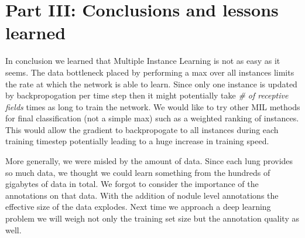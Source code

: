 \documentclass[twocolumn,10pt]{article}
\begin{document}
\section{Part III: Conclusions and lessons learned}

In conclusion we learned that Multiple Instance Learning is not as easy as it seems. The data bottleneck placed by performing a max over all instances limits the rate at which the network is able to learn. Since only one instance is updated by backpropogation per time step then it might potentially take \textit{\# of receptive fields} times as long to train the network. We would like to try other MIL methods for final classification (not a simple max) such as a weighted ranking of instances. This would allow the gradient to backpropogate to all instances during each training timestep potentially leading to a huge increase in training speed.

More generally, we were misled by the amount of data. Since each lung provides so much data, we thought we could learn something from the hundreds of gigabytes of data in total. We forgot to consider the importance of the annotations on that data. With the addition of nodule level annotations the effective size of the data explodes. Next time we approach a deep learning problem we will weigh not only the training set size but the annotation quality as well. 



\end{document}
